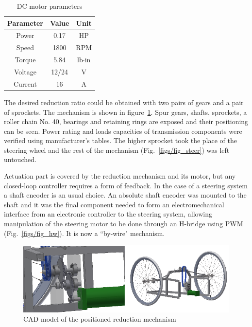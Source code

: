 \documentclass[twocolumn,10pt]{asme2e}
\begin{document}
\begin{table}[ht!]
\centering
\begin{tabular}{ c | c | c }
\hline
Parameter & Value & Unit\\
\hline
Power & 0.17 & HP\\
Speed & 1800 & RPM\\
Torque & 5.84 & lb$\cdot$in\\
Voltage & 12/24 & V\\
Current & 16 & A\\
\hline
\end{tabular}
\caption{DC motor parameters}
\label{motor_params}
\end{table}

The desired reduction ratio could be obtained with two pairs of gears
and a pair of sprockets. The mechanism is shown in figure~\ref{figs/fig_gearbox}.
Spur gears, shafts, sprockets, a roller chain No. 40, bearings and retaining
rings are exposed and their positioning can be seen. Power rating and loads
capacities of transmission components were verified using manufacturer's tables.
The higher sprocket took the place of the steering wheel and the rest of the
mechanism (Fig.~\ref{figs/fig_steer}) was left untouched.

Actuation part is covered by the reduction mechanism and its motor, but any
closed-loop controller requires a form of feedback. In the case of a steering system a
shaft encoder is an usual choice. An absolute shaft encoder was mounted to the shaft and 
it was the final component needed to form an electromechanical interface from
an electronic controller to the steering system, allowing
manipulation of the steering motor to be done through an H-bridge using PWM
(Fig.~\ref{figs/fig_hw}). It is now a ``by-wire" mechanism.

\begin{figure}[ht!]
\begin{center}
\includegraphics{figs/fig_gearbox.eps}
\caption{CAD model of the positioned reduction mechanism}
\label{figs/fig_gearbox}
\end{center}
\end{figure}
\end{document}

